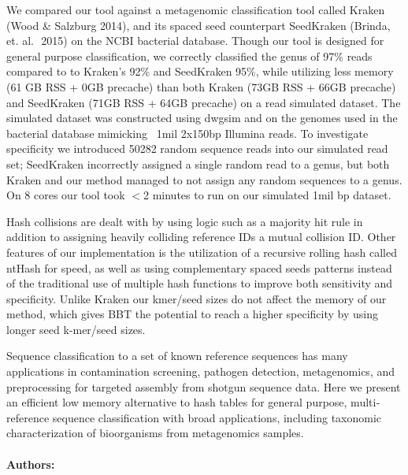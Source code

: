 We compared our tool against a metagenomic classification tool called Kraken (Wood & 
Salzburg 2014), and its spaced seed counterpart Seed­Kraken (Brinda, ​
et. al. ​ 2015) on the 
NCBI bacterial database. Though our tool is designed for general purpose classification, we 
correctly classified the genus of 97\% reads compared to to Kraken’s 92\% and Seed­Kraken 
95\%, while utilizing less memory (61 GB RSS + 0GB pre­cache) than both Kraken (73GB RSS 
+ 66GB pre­cache) and Seed­Kraken (71GB RSS + 64GB pre­cache) on a read simulated 
dataset. The simulated dataset was constructed using dwgsim and on the genomes used in the 
bacterial database mimicking ~1mil 2x150bp Illumina reads. To investigate specificity we 
introduced 50282 random sequence reads into our simulated read set; Seed­Kraken incorrectly 
assigned a single random read to a genus, but both Kraken and our method managed to not assign any random sequences to a genus. On 8 cores our tool took $<$2 minutes to run on our 
simulated 1mil bp dataset.
 
Hash collisions are dealt with by using logic such as a majority hit rule in addition to 
assigning heavily colliding reference IDs a mutual collision ID. Other features of our 
implementation is the utilization of a recursive rolling hash called ntHash for speed, as well as 
using complementary spaced seeds patterns instead of the traditional use of multiple hash 
functions to improve both sensitivity and specificity. Unlike Kraken our k­mer/seed sizes do not 
affect the memory of our method, which gives BBT the potential to reach a higher specificity by 
using longer seed k-mer/seed sizes. 

Sequence classification to a set of known reference sequences has many applications in 
contamination screening, pathogen detection, metagenomics, and preprocessing for targeted 
assembly from shotgun sequence data. Here we present an efficient low memory alternative to 
hash tables for general purpose, multi­reference sequence classification with broad 
applications, including taxonomic characterization of bio­organisms from metagenomics 
samples.


\noindent \paragraph{Authors:} 

